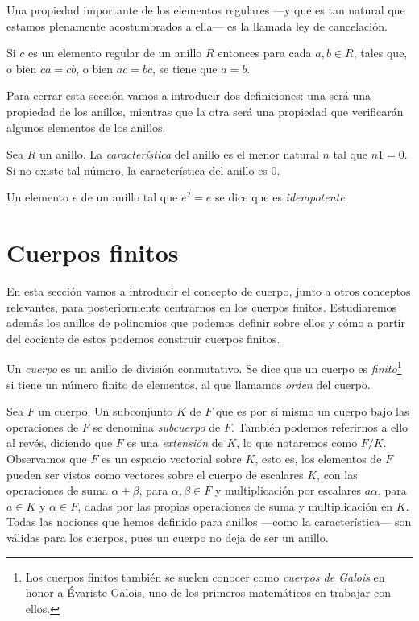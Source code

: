 Una propiedad importante de los elementos regulares —y que es tan natural que estamos plenamente acostumbrados a ella— es la llamada ley de cancelación.
\begin{proposition}
  Si \(c\) es un elemento regular de un anillo \(R\) entonces para cada \(a, b \in R\), tales que, o bien \(ca = cb\), o bien \(ac = bc\), se tiene que \(a = b\).
\end{proposition}

Para cerrar esta sección vamos a introducir dos definiciones: una será una propiedad de los anillos, mientras que la otra será una propiedad que verificarán algunos elementos de los anillos.

\begin{definition}
  Sea \(R\) un anillo. La \textit{característica} del anillo es el menor natural \(n\) tal que \(n1 = 0\).
  Si no existe tal número, la característica del anillo es \(0\).  
\end{definition}

\begin{definition}
  Un elemento \(e\) de un anillo tal que \(e^2 = e\) se dice que es \textit{idempotente}.
\end{definition}

\section{Cuerpos finitos}

En esta sección vamos a introducir el concepto de cuerpo, junto a otros conceptos relevantes, para posteriormente centrarnos en los cuerpos finitos.
Estudiaremos además los anillos de polinomios que podemos definir sobre ellos y cómo a partir del cociente de estos podemos construir cuerpos finitos.

\begin{definition}
  Un \textit{cuerpo} es un anillo de división conmutativo.
  Se dice que un cuerpo es \textit{finito}\footnote{Los cuerpos finitos también se suelen conocer como \textit{cuerpos de Galois} en honor a Évariste Galois, uno de los primeros matemáticos en trabajar con ellos.} si tiene un número finito de elementos, al que llamamos \textit{orden} del cuerpo.
\end{definition}

Sea \(F\) un cuerpo. Un subconjunto \(K\) de \(F\) que es por sí mismo un cuerpo bajo las operaciones de \(F\) se denomina \textit{subcuerpo} de \(F\).
También podemos referirnos a ello al revés, diciendo que \(F\) es una \textit{extensión} de \(K\), lo que notaremos como \(F/K\).
Observamos que \(F\) es un espacio vectorial sobre \(K\), esto es, los elementos de \(F\) pueden ser vistos como vectores sobre el cuerpo de escalares \(K\), con las operaciones de suma \(\alpha + \beta\), para \(\alpha, \beta \in F\) y multiplicación por escalares \(a\alpha\), para \(a \in K\) y \(\alpha \in F\), dadas por las propias operaciones de suma y multiplicación en \(K\).
Todas las nociones que hemos definido para anillos —como la característica— son válidas para los cuerpos, pues un cuerpo no deja de ser un anillo.

